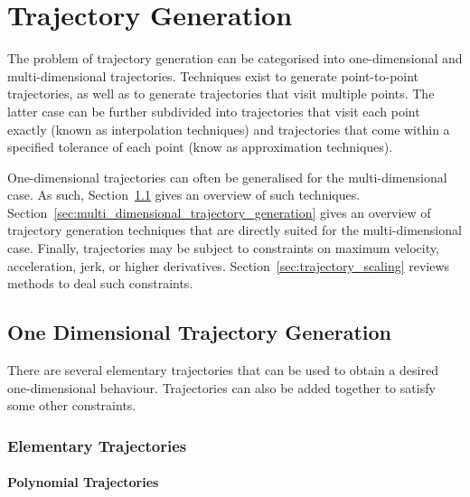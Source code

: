 \section{Trajectory Generation}%
\label{sec:trajectory_generation}

	The problem of trajectory generation can be categorised into one-dimensional
	and multi-dimensional trajectories. Techniques exist to generate
	point-to-point trajectories, as well as to generate trajectories that visit
	multiple points. The latter case can be further subdivided into trajectories
	that visit each point exactly (known as interpolation techniques) and
	trajectories that come within a specified tolerance of each point (know as
	approximation techniques). 

	One-dimensional trajectories can often be generalised for the
	multi-dimensional case. As such,
	Section~\ref{sec:one_dimensional_trajectory_generation} gives an overview of
	such techniques. Section~\ref{sec:multi_dimensional_trajectory_generation}
	gives an overview of trajectory generation techniques that are directly
	suited for the multi-dimensional case. Finally, trajectories may be subject
	to constraints on maximum velocity, acceleration, jerk, or higher
	derivatives.  Section~\ref{sec:trajectory_scaling} reviews methods to deal
	such constraints.

	\subsection{One Dimensional Trajectory Generation}%
	\label{sec:one_dimensional_trajectory_generation}

		There are several elementary trajectories that can be used to obtain a
		desired one-dimensional behaviour. Trajectories can also be added
		together to satisfy some other constraints. 


		\subsubsection{Elementary Trajectories}%
		\label{sec:elementary_trajectories}

			\paragraph{Polynomial Trajectories}

